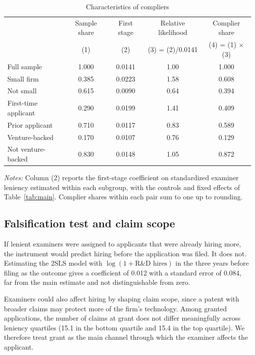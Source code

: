 \documentclass[11pt]{article}
\begin{document}
\begin{table}[htbp]
\centering
\begin{threeparttable}
\caption{Characteristics of compliers}
\label{tab:compliers}
\small
\begin{tabular}{lcccc}
\toprule
 & Sample share & First stage & Relative likelihood & Complier share \\
 & (1) & (2) & (3) = (2)/0.0141 & (4) = (1) $\times$ (3) \\
\midrule
Full sample & 1.000 & 0.0141 & 1.00 & 1.000 \\[0.3em]
Small firm & 0.385 & 0.0223 & 1.58 & 0.608 \\
Not small & 0.615 & 0.0090 & 0.64 & 0.394 \\[0.3em]
First-time applicant & 0.290 & 0.0199 & 1.41 & 0.409 \\
Prior applicant & 0.710 & 0.0117 & 0.83 & 0.589 \\[0.3em]
Venture-backed & 0.170 & 0.0107 & 0.76 & 0.129 \\
Not venture-backed & 0.830 & 0.0148 & 1.05 & 0.872 \\
\bottomrule
\end{tabular}
\begin{tablenotes}\footnotesize
\item \textit{Notes:} Column (2) reports the first-stage coefficient on standardized examiner leniency estimated within each subgroup, with the controls and fixed effects of Table~\ref{tab:main}. Complier shares within each pair sum to one up to rounding.
\end{tablenotes}
\end{threeparttable}
\end{table}

\subsection{Falsification test and claim scope}

If lenient examiners were assigned to applicants that were already hiring more, the instrument would predict hiring before the application was filed. It does not. Estimating the 2SLS model with $\log(1 + \text{R\&D hires})$ in the three years before filing as the outcome gives a coefficient of 0.012 with a standard error of 0.084, far from the main estimate and not distinguishable from zero.

Examiners could also affect hiring by shaping claim scope, since a patent with broader claims may protect more of the firm's technology. Among granted applications, the number of claims at grant does not differ meaningfully across leniency quartiles (15.1 in the bottom quartile and 15.4 in the top quartile). We therefore treat grant as the main channel through which the examiner affects the applicant.
\end{document}
